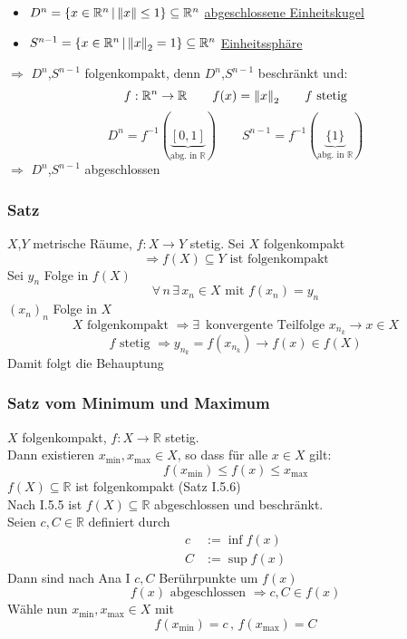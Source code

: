 \begin{itemize}
	\item $D^n = \{ x \in \mathbb{R}^n \, | \, \norm{x} \leq 1 \} \subseteq \mathbb{R}^n$ \qquad \underline{abgeschlossene Einheitskugel}
	\item $S^{n-1}= \{ x \in \mathbb{R}^n \, | \, \norm{x}_2=1 \} \subseteq \mathbb{R}^n$ \qquad \underline{Einheitssphäre}
\end{itemize}
$\Rightarrow$ $D^n$,$S^{n-1}$ folgenkompakt, denn $D^n$,$S^{n-1}$ beschränkt und:
\[
	f: \mathbb{R}^n \to \mathbb{R} \qquad f(x)=\norm{x}_2 \qquad f \text{ stetig}
\]
\[
	D^n = f^{-1}(\underset{\text{abg. in $\mathbb{R}$}}{\underbrace{[0,1]}}) \qquad S^{n-1}=f^{-1}(\underset{\text{abg. in $\mathbb{R}$}}{\underbrace{\{1\}}})
\]
$\Rightarrow$ $D^n$,$S^{n-1}$ abgeschlossen

\subsubsection{Satz} %
\label{ssub:satz}
$X$,$Y$ metrische Räume, $f: X \to Y$ stetig. Sei $X$ folgenkompakt 
\[
	\Rightarrow f(X) \subseteq Y \text{ ist folgenkompakt}
\]
Sei $y_n$ Folge in $f(X)$ \\
\[ \forall\, n \, \exists\, x_n \in X \text{ mit } f(x_n)=y_n \] 
$(x_n)_n$ Folge in $X$
\[
	X \text{ folgenkompakt } \Rightarrow  \exists\, \text{ konvergente Teilfolge } x_{n_k} \to x \in X
\]
\[
	f \text{ stetig } \Rightarrow y_{n_k} = f(x_{n_k}) \to f(x) \in f(X)
\]
Damit folgt die Behauptung
\bewende

\subsubsection{Satz vom Minimum und Maximum} %
\label{ssub:satz_vom_minimum_und_maximum}
$X$ folgenkompakt, $f: X \to \mathbb{R}$ stetig. \\ Dann existieren $x_{\text{min}},x_{\text{max}} \in X$, so dass für alle $x \in X$ gilt:
\[
	f(x_{\text{min}}) \leq f(x) \leq x_{\text{max}}
\]
$f(X) \subseteq \mathbb{R}$ ist folgenkompakt (Satz I.5.6) \\
Nach I.5.5 ist $f(X) \subseteq \mathbb{R}$ abgeschlossen und beschränkt. \\
Seien $c,C \in \mathbb{R}$ definiert durch
\begin{align*}
	c &:= \inf f(x) \\
	C &:= \sup f(x)
\end{align*}
Dann sind nach Ana I $c,C$ Berührpunkte um $f(x)$
\[
	f(x) \text{ abgeschlossen } \Rightarrow c,C \in f(x)
\]
Wähle nun $x_{\text{min}},x_{\text{max}} \in X$ mit
\[
	f(x_{\text{min}})=c \,,\,f(x_{\text{max}})=C
\] \bewende


